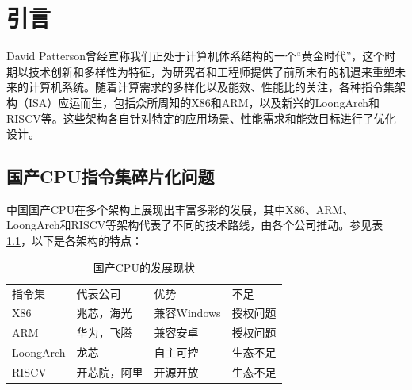 \chapter{引言}\label{chap:introduction}


David Patterson曾经宣称我们正处于计算机体系结构的一个“黄金时代”，这个时期以技术创新和多样性为特征，为研究者和工程师提供了前所未有的机遇来重塑未来的计算机系统。随着计算需求的多样化以及能效、性能比的关注，各种指令集架构（ISA）应运而生，包括众所周知的X86和ARM，以及新兴的LoongArch和RISCV等。这些架构各自针对特定的应用场景、性能需求和能效目标进行了优化设计。

\section{国产CPU指令集碎片化问题}

中国国产CPU在多个架构上展现出丰富多彩的发展，其中X86、ARM、LoongArch和RISCV等架构代表了不同的技术路线，由各个公司推动。参见表\ref{tab:CPUs}，以下是各架构的特点：

\begin{table}[]
\centering
\caption{国产CPU的发展现状}
\label{tab:CPUs}
    \begin{tabular}{llll}
    \rowcolor[HTML]{FBE5D6} 
    指令集       & 代表公司   & 优势        & 不足         \\
    X86       & 兆芯，海光  & 兼容Windows & 授权问题 \\
    ARM       & 华为，飞腾  & 兼容安卓      & 授权问题       \\
    LoongArch & 龙芯     & 自主可控      & 生态不足       \\
    RISCV     & 开芯院，阿里 & 开源开放      & 生态不足      
    \end{tabular}
    \end{table}


